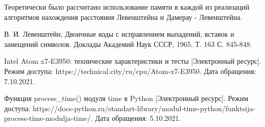 \documentclass[12pt]{report}
\begin{document}
Теоретически было рассчитано использование памяти в каждой из реализаций алгоритмов нахождения расстояния Левенштейна и Дамерау - Левенштейна.




\begin{thebibliography}{9}
	 В. И. Левенштейн, Двоичные коды с исправлением выпадений, вставок и замещений символов. Доклады Академий Наук СССР, 1965. Т. 163 С. 845-848.
	
	 Intel Atom x7-E3950: технические характеристики и тесты [Электронный ресурс]. Режим доступа: https://technical.city/ru/cpu/Atom-x7-E3950. Дата обращения: 7.10.2021.
	
	 Функция process\_time() модуля time в Python [Электронный ресурс]. Режим доступа: https://docs-python.ru/standart-library/modul-time-python/funktsija-process-time-modulja-time/. Дата обращения: 5.10.2021.
\end{thebibliography}
\end{document}
